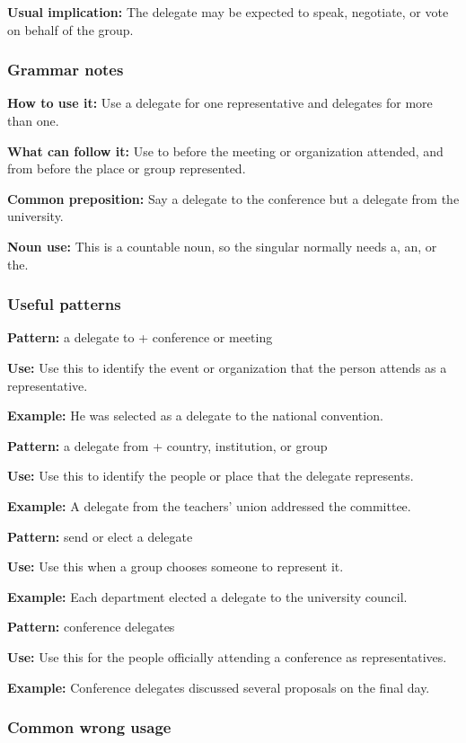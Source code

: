 \documentclass[11pt]{article}
\begin{document}
\textbf{Usual implication:} The delegate may be expected to speak, negotiate, or vote on behalf of the group.

\subsubsection{Grammar notes}
\textbf{How to use it:} Use a delegate for one representative and delegates for more than one.

\textbf{What can follow it:} Use to before the meeting or organization attended, and from before the place or group represented.

\textbf{Common preposition:} Say a delegate to the conference but a delegate from the university.

\textbf{Noun use:} This is a countable noun, so the singular normally needs a, an, or the.

\subsubsection{Useful patterns}
\textbf{Pattern:} a delegate to + conference or meeting

\textbf{Use:} Use this to identify the event or organization that the person attends as a representative.

\textbf{Example:} He was selected as a delegate to the national convention.

\textbf{Pattern:} a delegate from + country, institution, or group

\textbf{Use:} Use this to identify the people or place that the delegate represents.

\textbf{Example:} A delegate from the teachers' union addressed the committee.

\textbf{Pattern:} send or elect a delegate

\textbf{Use:} Use this when a group chooses someone to represent it.

\textbf{Example:} Each department elected a delegate to the university council.

\textbf{Pattern:} conference delegates

\textbf{Use:} Use this for the people officially attending a conference as representatives.

\textbf{Example:} Conference delegates discussed several proposals on the final day.

\subsubsection{Common wrong usage}
\end{document}
